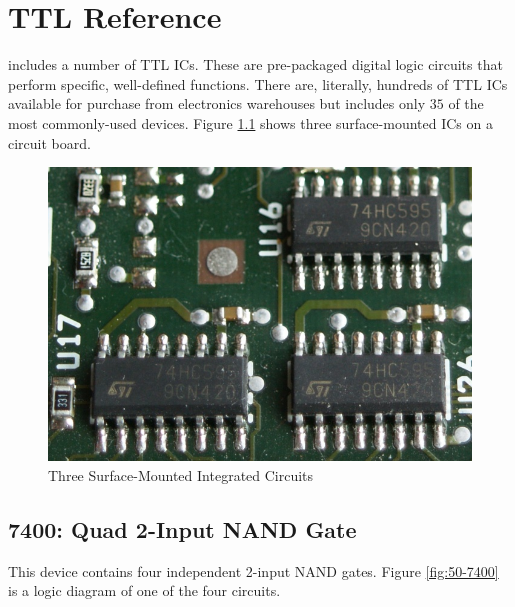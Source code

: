 
\chapter{TTL Reference}

\LE includes a number of \ac{TTL} \acp{IC}. These are pre-packaged digital logic circuits that perform specific, well-defined functions. There are, literally, hundreds of \ac{TTL} \acp{IC} available for purchase from electronics warehouses but \LE includes only $ 35 $ of the most commonly-used devices. Figure \ref{fig:50-74HC595} shows three surface-mounted \acp{IC} on a circuit board.

\begin{figure}[H]
	\centering
	\includegraphics[width=\maxwidth{.75\linewidth}]{gfx/50-74HC595}
	\caption{Three Surface-Mounted Integrated Circuits}
	\label{fig:50-74HC595}
\end{figure}

\section{7400: Quad 2-Input NAND Gate}

This device contains four independent 2-input NAND gates. Figure \ref{fig:50-7400} is a logic diagram of one of the four circuits.

